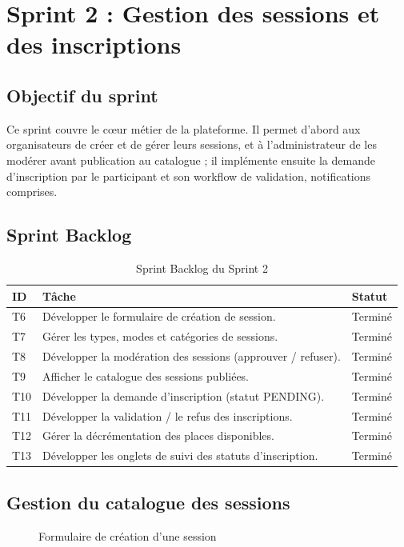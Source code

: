 \section{Sprint 2 : Gestion des sessions et des inscriptions}

\subsection{Objectif du sprint}
Ce sprint couvre le cœur métier de la plateforme. Il permet d'abord aux organisateurs de créer
et de gérer leurs sessions, et à l'administrateur de les modérer avant publication au
catalogue ; il implémente ensuite la demande d'inscription par le participant et son workflow
de validation, notifications comprises.

\subsection{Sprint Backlog}
\begin{table}[H]\centering\renewcommand{\arraystretch}{1.25}
\begin{tabular}{|p{1cm}|p{10.5cm}|p{1.6cm}|}\hline
\rowcolor{gray!15}\textbf{ID} & \textbf{Tâche} & \textbf{Statut} \\ \hline
T6 & Développer le formulaire de création de session. & Terminé \\ \hline
T7 & Gérer les types, modes et catégories de sessions. & Terminé \\ \hline
T8 & Développer la modération des sessions (approuver / refuser). & Terminé \\ \hline
T9 & Afficher le catalogue des sessions publiées. & Terminé \\ \hline
T10 & Développer la demande d'inscription (statut PENDING). & Terminé \\ \hline
T11 & Développer la validation / le refus des inscriptions. & Terminé \\ \hline
T12 & Gérer la décrémentation des places disponibles. & Terminé \\ \hline
T13 & Développer les onglets de suivi des statuts d'inscription. & Terminé \\ \hline
\end{tabular}
\caption{Sprint Backlog du Sprint 2}\label{tab:sb2}
\end{table}

\subsection{Gestion du catalogue des sessions}
\begin{figure}[H]\centering
  \caption{Formulaire de création d'une session}\label{fig:create-event}
\end{figure}

